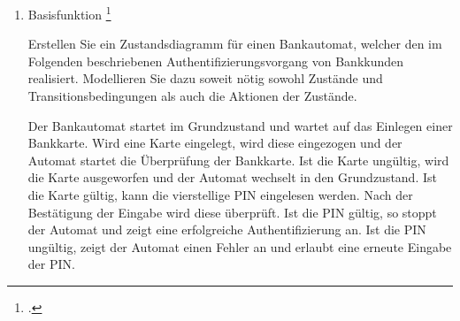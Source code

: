 \documentclass{bschlangaul-aufgabe}
\begin{document}

\begin{enumerate}


\item Basisfunktion
\footcite{examen:66116:2020:03}

Erstellen Sie ein Zustandsdiagramm für einen Bankautomat, welcher den im
Folgenden beschriebenen Authentifizierungsvorgang von Bankkunden
realisiert. Modellieren Sie dazu soweit nötig sowohl Zustände und
Transitionsbedingungen als auch die Aktionen der Zustände.

Der Bankautomat startet im Grundzustand und wartet auf das Einlegen
einer Bankkarte. Wird eine Karte eingelegt, wird diese eingezogen und
der Automat startet die Überprüfung der Bankkarte. Ist die Karte
ungültig, wird die Karte ausgeworfen und der Automat wechselt in den
Grundzustand. Ist die Karte gültig, kann die vierstellige PIN eingelesen
werden. Nach der Bestätigung der Eingabe wird diese überprüft. Ist die
PIN gültig, so stoppt der Automat und zeigt eine erfolgreiche
Authentifizierung an. Ist die PIN ungültig, zeigt der Automat einen
Fehler an und erlaubt eine erneute Eingabe der PIN.

\begin{liAntwort}
\end{liAntwort}
\end{enumerate}
\end{document}
